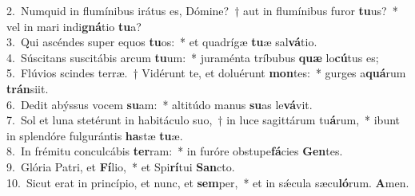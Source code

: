 {2.~}Numquid in flumínibus irátus es, Dómine?~† aut in flumínibus furor \textbf{tu}us?~* vel in mari indi\textbf{gná}tio \textbf{tu}a?\\
{3.~}Qui ascéndes super equos \textbf{tu}os:~* et quadrígæ \textbf{tu}æ sal\textbf{vá}tio.\\
{4.~}Súscitans suscitábis arcum \textbf{tu}um:~* juraménta tríbubus \textbf{quæ} lo\textbf{cú}tus es;\\
{5.~}Flúvios scindes terræ.~† Vidérunt te, et doluérunt \textbf{mon}tes:~* gurges a\textbf{quá}rum \textbf{trán}siit.\\
{6.~}Dedit abýssus vocem \textbf{su}am:~* altitúdo manus \textbf{su}as le\textbf{vá}vit.\\
{7.~}Sol et luna stetérunt in habitáculo suo,~† in luce sagittárum tu\textbf{á}rum,~* ibunt in splendóre fulgurántis \textbf{ha}stæ \textbf{tu}æ.\\
{8.~}In frémitu conculcábis \textbf{ter}ram:~* in furóre obstupe\textbf{fá}cies \textbf{Gen}tes.\\
{9.~}Glória Patri, et \textbf{Fí}lio,~* et Spi\textbf{rí}tui \textbf{San}cto.\\
{10.~}Sicut erat in princípio, et nunc, et \textbf{sem}per,~* et in sǽcula sæcu\textbf{ló}rum. \textbf{A}men.\\
